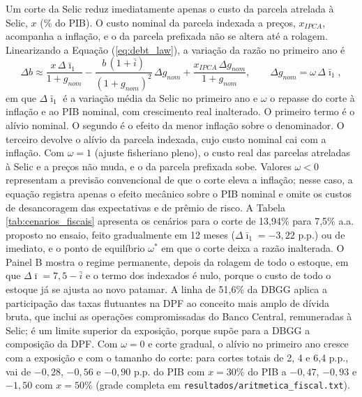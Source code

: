 \documentclass[12pt,a4paper]{article}
\begin{document}
Um corte da Selic reduz imediatamente apenas o custo da parcela atrelada à Selic, $x$ (\% do PIB). O custo nominal da parcela indexada a preços, $x_{IPCA}$, acompanha a inflação, e o da parcela prefixada não se altera até a rolagem. Linearizando a Equação (\ref{eq:debt_law}), a variação da razão no primeiro ano é
\begin{equation}
\Delta b \approx \frac{x\,\Delta \bar{\imath}_1}{1+g_{nom}} - \frac{b\,(1+\bar{i})}{(1+g_{nom})^2}\,\Delta g_{nom} + \frac{x_{IPCA}\,\Delta g_{nom}}{1+g_{nom}}, \qquad \Delta g_{nom} = \omega\,\Delta \bar{\imath}_1,
\label{eq:fiscal_scen}
\end{equation}
em que $\Delta\bar{\imath}_1$ é a variação média da Selic no primeiro ano e $\omega$ o repasse do corte à inflação e ao PIB nominal, com crescimento real inalterado. O primeiro termo é o alívio nominal. O segundo é o efeito da menor inflação sobre o denominador. O terceiro devolve o alívio da parcela indexada, cujo custo nominal cai com a inflação. Com $\omega = 1$ (ajuste fisheriano pleno), o custo real das parcelas atreladas à Selic e a preços não muda, e o da parcela prefixada sobe. Valores $\omega < 0$ representam a previsão convencional de que o corte eleva a inflação; nesse caso, a equação registra apenas o efeito mecânico sobre o PIB nominal e omite os custos de desancoragem das expectativas e de prêmio de risco. A Tabela \ref{tab:cenarios_fiscais} apresenta os cenários para o corte de 13,94\% para 7,5\% a.a. proposto no ensaio, feito gradualmente em 12 meses ($\Delta\bar{\imath}_1 = -3{,}22$ p.p.) ou de imediato, e o ponto de equilíbrio $\omega^*$ em que o corte deixa a razão inalterada. O Painel B mostra o regime permanente, depois da rolagem de todo o estoque, em que $\Delta\bar{\imath} = 7{,}5 - \bar{i}$ e o termo dos indexados é nulo, porque o custo de todo o estoque já se ajusta ao novo patamar. A linha de 51,6\% da DBGG aplica a participação das taxas flutuantes na DPF ao conceito mais amplo de dívida bruta, que inclui as operações compromissadas do Banco Central, remuneradas à Selic; é um limite superior da exposição, porque supõe para a DBGG a composição da DPF. Com $\omega = 0$ e corte gradual, o alívio no primeiro ano cresce com a exposição e com o tamanho do corte: para cortes totais de 2, 4 e 6,4 p.p., vai de $-0{,}28$, $-0{,}56$ e $-0{,}90$ p.p. do PIB com $x = 30\%$ do PIB a $-0{,}47$, $-0{,}93$ e $-1{,}50$ com $x = 50\%$ (grade completa em \texttt{resultados/aritmetica\_fiscal.txt}).
\end{document}
